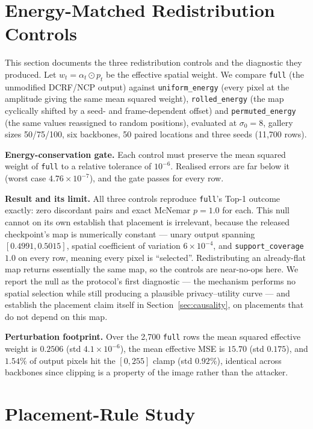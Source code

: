 \documentclass[10pt,journal]{IEEEtran}
\begin{document}
\section{Energy-Matched Redistribution Controls}
\label{sec:spatial_causality}

This section documents the three redistribution controls and the diagnostic
they produced. Let $w_t=\alpha_t\odot p_t$ be the effective spatial weight. We
compare \texttt{full} (the unmodified DCRF/NCP output) against
\texttt{uniform\_energy} (every pixel at the amplitude giving the same mean
squared weight), \texttt{rolled\_energy} (the map cyclically shifted by a
seed- and frame-dependent offset) and \texttt{permuted\_energy} (the same
values reassigned to random positions), evaluated at $\sigma_0=8$, gallery
sizes 50/75/100, six backbones, 50 paired locations and three seeds
(11,700 rows).

\textbf{Energy-conservation gate.} Each control must preserve the mean squared
weight of \texttt{full} to a relative tolerance of $10^{-6}$. Realised errors
are far below it (worst case $4.76\times10^{-7}$), and the gate passes for
every row.

\textbf{Result and its limit.} All three controls reproduce \texttt{full}'s
Top-1 outcome exactly: zero discordant pairs and exact McNemar $p=1.0$ for
each. This null cannot on its own establish that placement is irrelevant,
because the released checkpoint's map is numerically constant --- unary output
spanning $[0.4991, 0.5015]$, spatial coefficient of variation
$6\times10^{-4}$, and \texttt{support\_coverage} $1.0$ on every row, meaning
every pixel is ``selected''. Redistributing an already-flat map returns
essentially the same map, so the controls are near-no-ops here. We report the
null as the protocol's first diagnostic --- the mechanism performs no spatial
selection while still producing a plausible privacy--utility curve --- and
establish the placement claim itself in Section~\ref{sec:causality}, on
placements that do not depend on this map.

\textbf{Perturbation footprint.} Over the 2,700 \texttt{full} rows the mean
squared effective weight is $0.2506$ (std $4.1\times10^{-6}$), the mean
effective MSE is $15.70$ (std $0.175$), and $1.54\%$ of output pixels hit the
$[0,255]$ clamp (std $0.92\%$), identical across backbones since clipping is a
property of the image rather than the attacker.

\section{Placement-Rule Study}
\label{sec:placement_appendix}
\end{document}
